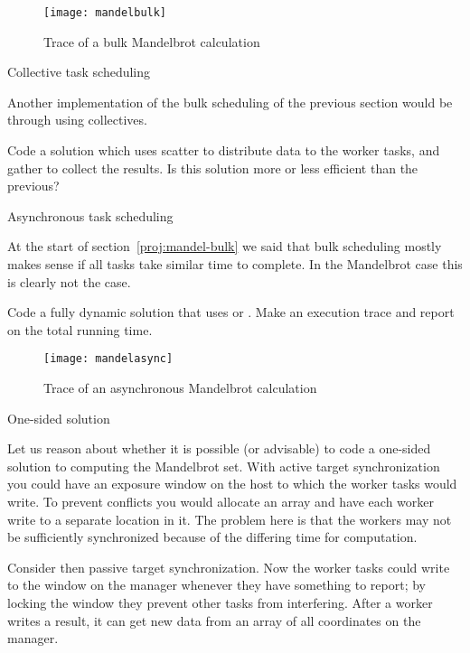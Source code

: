 \begin{figure}[ht]
\texttt{[image: mandelbulk]}
\caption{Trace of a bulk Mandelbrot calculation}
\label{fig:mandel-bulk}
\end{figure}

 {Collective task scheduling}
\label{proj:mandel-collective}

Another implementation of the bulk scheduling of the previous section
would be through using collectives.

\begin{exercise}
  Code a solution which uses scatter to distribute data to the worker
  tasks, and gather to collect the results. Is this solution more or
  less efficient than the previous?
\end{exercise}

 {Asynchronous task scheduling}

At the start of section~\ref{proj:mandel-bulk} we said that bulk scheduling
mostly makes sense if all tasks take similar time to complete.
In the Mandelbrot case this is clearly not the case.

\begin{exercise}
  Code a fully dynamic solution that uses  or .
  Make an execution trace and report on the total running time.
\end{exercise}

\begin{figure}[ht]
\texttt{[image: mandelasync]}
\caption{Trace of an asynchronous Mandelbrot calculation}
\label{fig:mandel-async}
\end{figure}

 {One-sided solution}

Let us reason about whether it is possible (or advisable) to code a
one-sided solution to computing the Mandelbrot set.  
%
With active
target synchronization you could have an exposure window on the host
to which the worker tasks would write. To prevent conflicts you would allocate an 
array and have each worker write to a separate location in it.
%
The problem here is that the workers may not be sufficiently synchronized because
of the differing time for computation.

Consider then passive target synchronization. Now the worker tasks could
write to the window on the manager whenever they have something to
report; by locking the window they prevent other tasks from interfering.
%
After a worker writes a result, it can get new data from an array
of all coordinates on the manager. 

